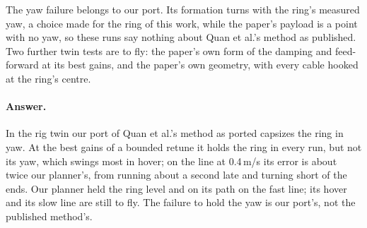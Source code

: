 The yaw failure belongs to our port. Its formation turns with the ring's measured yaw, a choice made for the ring of
this work, while the paper's payload is a point with no yaw, so these runs say nothing about Quan et al.'s method as
published. Two further twin tests are to fly: the paper's own form of the damping and feed-forward at its best gains, and
the paper's own geometry, with every cable hooked at the ring's centre.



\paragraph{Answer.} In the rig twin our port of Quan et al.'s method as ported capsizes the ring in yaw. At the best
gains of a bounded retune it holds the ring in every run, but not its yaw, which swings most in hover; on the line at
0.4\,m/s its error is about twice our planner's, from running about a second late and turning short of the ends. Our
planner held the ring level and on its path on the fast line; its hover and its slow line are still to fly. The
failure to hold the yaw is our port's, not the published method's.
